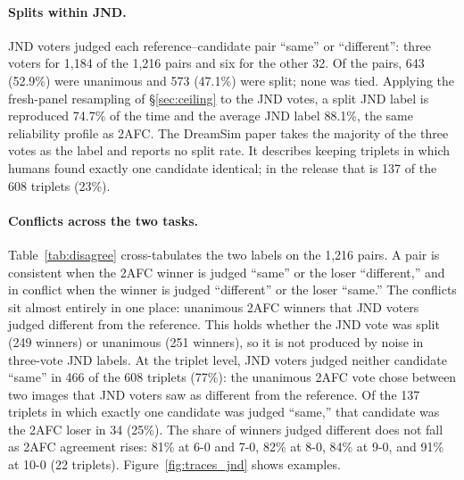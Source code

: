 \paragraph{Splits within JND.} JND voters judged each reference--candidate pair ``same'' or ``different'': three voters for 1{,}184 of the 1{,}216 pairs and six for the other 32. Of the pairs, 643 (52.9\%) were unanimous and 573 (47.1\%) were split; none was tied. Applying the fresh-panel resampling of \S\ref{sec:ceiling} to the JND votes, a split JND label is reproduced 74.7\% of the time and the average JND label 88.1\%, the same reliability profile as 2AFC. The DreamSim paper takes the majority of the three votes as the label and reports no split rate. It describes keeping triplets in which humans found exactly one candidate identical; in the release that is 137 of the 608 triplets (23\%).

\paragraph{Conflicts across the two tasks.} Table~\ref{tab:disagree} cross-tabulates the two labels on the 1{,}216 pairs. A pair is consistent when the 2AFC winner is judged ``same'' or the loser ``different,'' and in conflict when the winner is judged ``different'' or the loser ``same.'' The conflicts sit almost entirely in one place: unanimous 2AFC winners that JND voters judged different from the reference. This holds whether the JND vote was split (249 winners) or unanimous (251 winners), so it is not produced by noise in three-vote JND labels. At the triplet level, JND voters judged neither candidate ``same'' in 466 of the 608 triplets (77\%): the unanimous 2AFC vote chose between two images that JND voters saw as different from the reference. Of the 137 triplets in which exactly one candidate was judged ``same,'' that candidate was the 2AFC loser in 34 (25\%). The share of winners judged different does not fall as 2AFC agreement rises: 81\% at 6-0 and 7-0, 82\% at 8-0, 84\% at 9-0, and 91\% at 10-0 (22 triplets). Figure~\ref{fig:traces_jnd} shows examples.

